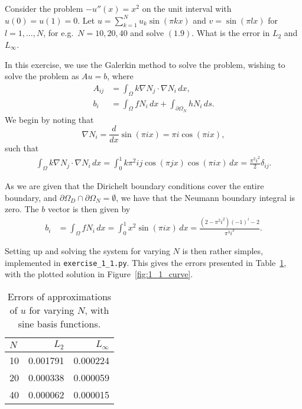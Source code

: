 \begin{exercise}
    Consider the problem $-u''(x) = x^2$ on the unit interval with $u(0) = u(1) = 0$.
    Let $u = \sum_{k = 1}^N u_k \sin{(\pi k x)}$ and $v = \sin{(\pi l x)}$ for $l = 1, \ldots, N$, for e.g.\ $N = 10, 20, 40$ and solve $(1.9)$.
    What is the error in $L_2$ and $L_\infty$.
\end{exercise}

\begin{solution}
    In this exercise, we use the Galerkin method to solve the problem, wishing to solve the problem as $Au = b$, where
    \begin{align*}
        A_{ij} &= \int_\Omega k \nabla N_j \cdot \nabla N_i \, dx, \\
        b_i &= \int_\Omega f N_i \, dx + \int_{\partial \Omega_N} h N_i \, ds.
    \end{align*}
    We begin by noting that
    \begin{equation*}
        \nabla N_i = \frac{d}{dx} \sin{(\pi i x)} = \pi i \cos{(\pi i x)},
    \end{equation*}
    such that
    \begin{align*}
        \int_\Omega k \nabla N_j \cdot \nabla N_i \, dx
        = \int_0^1 k \pi^2 i j \cos{(\pi j x)} \cos{(\pi i x)} \, dx
        = \frac{\pi^2 i^2}{2} \delta_{ij}.
    \end{align*}

    As we are given that the Dirichelt boundary conditions cover the entire boundary, and $\partial \Omega_D \cap \partial \Omega_N = \emptyset$, we have that the Neumann boundary integral is zero.
    The $b$ vector is then given by
    \begin{align*}
        b_i &= \int_\Omega f N_i \, dx
        = \int_0^1 x^2 \sin{(\pi i x)} \, dx
        = \frac{(2 - \pi^2 i^2)(-1)^i- 2}{\pi^3 i^3}.
    \end{align*}

    Setting up and solving the system for varying $N$ is then rather simples, implemented in \verb|exercise_1_1.py|.
    This gives the errors presented in Table~\ref{tab:1_1}, with the plotted solution in Figure~\ref{fig:1_1_curve}.
    \begin{table}[!h]
        \caption{Errors of approximations of $u$ for varying $N$, with sine basis functions.\label{tab:1_1}}
        \centering
        \begin{tabular}{lrr}
            \toprule
            $N$ & $L_2$ & $L_\infty$ \\
            \midrule
            10 & 0.001791 & 0.000224 \\
            20 & 0.000338 & 0.000059 \\
            40 & 0.000062 & 0.000015 \\
            \bottomrule
        \end{tabular}
    \end{table}


\end{solution}
